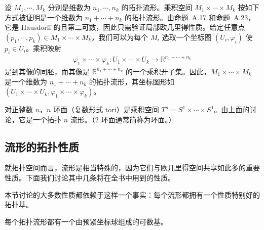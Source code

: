 \documentclass[../../main.tex]{subfiles}
\begin{document}
\begin{example}[乘积流形]\label{example:ch01-乘积流形}
设 $M_{1},\cdots ,M_{k}$ 分别是维数为 $n_{1},\cdots ,n_{k}$ 的拓扑流形。乘积空间 $M_{1}\times\cdots\times M_{k}$ 按如下方式被证明是一个维数为 $n_{1}+\cdots+n_{k}$ 的拓扑流形。由命题~A.17 和命题~A.23，它是 Hausdorff 的且第二可数，因此只需验证局部欧几里得性质。给定任意点 $(p_{1},\cdots ,p_{k})\in M_{1}\times\cdots\times M_{k}$，我们可以为每个 $M_{i}$ 选取一个坐标图 $(U_{i},\varphi_{i})$ 使 $p_{i}\in U_{i}$。乘积映射
\begin{align*}
\varphi_{1}\times\cdots\times\varphi_{k}:U_{1}\times\cdots\times U_{k}\to\mathbb{R}^{n_{1}+\cdots+n_{k}}
\end{align*}
是到其像的同胚，而其像是 $\mathbb{R}^{n_{1}+\cdots+n_{k}}$ 的一个乘积开子集。因此，$M_{1}\times\cdots\times M_{k}$ 是一个维数为 $n_{1}+\cdots+n_{k}$ 的拓扑流形，其坐标图形如 $(U_{1}\times\cdots\times U_{k},\varphi_{1}\times\cdots\times\varphi_{k})$。
\end{example}

\begin{example}[环面]\label{example:ch01-环面}
对正整数 $n$，$n$ 环面（复数形式 tori）是乘积空间 $T^{n}=S^{1}\times\cdots\times S^{1}$。由上面的讨论，它是一个拓扑 $n$ 流形。（$2$ 环面通常简称为环面。）
\end{example}

\subsection{流形的拓扑性质}\label{subsection:ch01-流形的拓扑性质}

就拓扑空间而言，流形是相当特殊的，因为它们与欧几里得空间共享如此多的重要性质。下面我们讨论其中几条将在全书中用到的性质。

本节讨论的大多数性质都依赖于这样一个事实：每个流形都拥有一个性质特别好的拓扑基。

\begin{lemma}\label{lemma:ch01-预紧坐标球可数基}
每个拓扑流形都有一个由预紧坐标球组成的可数基。
\end{lemma}
\end{document}

